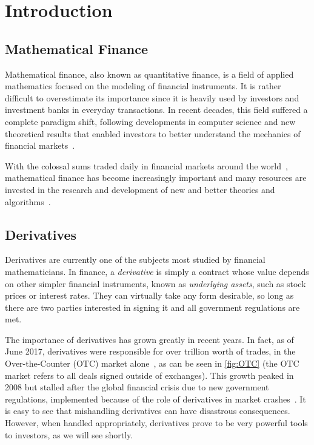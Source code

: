 \chapter{Introduction}
\label{chapter:introduction}
\section{Mathematical Finance}
\label{section:mathematical finance}
Mathematical finance, also known as quantitative finance, is a field of applied mathematics focused on the modeling of financial instruments.
It is rather difficult to overestimate its importance since it is heavily used by investors and investment banks in everyday transactions.
In recent decades, this field suffered a complete paradigm shift, following developments in computer science and new theoretical results that enabled investors to better understand the mechanics of financial markets~\citep{compfinance}.

With the colossal sums traded daily in financial markets around the world~\citep{WFE}, mathematical finance has become increasingly important and many resources are invested in the research and development of new and better theories and algorithms~\citep{quants}.


\section{Derivatives}
\label{section:derivatives}
Derivatives are currently one of the subjects most studied by financial mathematicians.
In finance, a \emph{derivative} is simply a contract whose value depends on other simpler financial instruments, known as \emph{underlying assets}, such as stock prices or interest rates.
They can virtually take any form desirable, so long as there are two parties interested in signing it and all government regulations are met.


The importance of derivatives has grown greatly in recent years. In fact, as of June 2017, derivatives were responsible for over  trillion worth of trades, in the Over-the-Counter (OTC) market alone~\citep{BIS}, as can be seen in \autoref{fig:OTC} (the OTC market refers to all deals signed outside of exchanges).
This growth peaked in 2008 but stalled after the global financial crisis due to new government regulations, implemented because of the role of derivatives in market crashes~\citep{FT}. It is easy to see that mishandling derivatives can have disastrous consequences. However, when handled appropriately, derivatives prove to be very powerful tools to investors, as we will see shortly.


